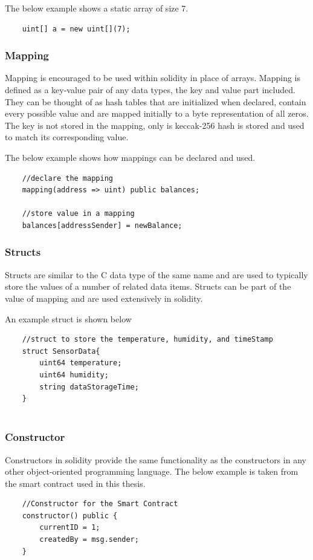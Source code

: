 \documentclass[11pt,openright]{report}
\begin{document}
The below example shows a static array of size 7.
\begin{verbatim}
    uint[] a = new uint[](7);
\end{verbatim}

\subsubsection{Mapping}
Mapping is encouraged to be used within solidity in place of arrays. Mapping is defined as a key-value pair of any data types, the key and value part included. They can be thought of as hash tables that are initialized when declared, contain every possible value and are mapped initially to a byte representation of all zeros. The key is not stored in the mapping, only is keccak-256 hash is stored and used to match its corresponding value.

The below example shows how mappings can be declared and used.
\begin{verbatim}
    //declare the mapping
    mapping(address => uint) public balances;
    
    //store value in a mapping
    balances[addressSender] = newBalance;
\end{verbatim}

\subsubsection{Structs}
Structs are similar to the C data type of the same name and are used to typically store the values of a number of related data items. Structs can be part of the value of mapping and are used extensively in solidity.

An example struct is shown below
\begin{verbatim}
    //struct to store the temperature, humidity, and timeStamp
    struct SensorData{
        uint64 temperature;
        uint64 humidity;
        string dataStorageTime;
    }
    
\end{verbatim}

\subsubsection{Constructor}
Constructors in solidity provide the same functionality as the constructors in any other object-oriented programming language. The below example is taken from the smart contract used in this thesis.
\begin{verbatim}
    //Constructor for the Smart Contract
    constructor() public {
        currentID = 1;
        createdBy = msg.sender;
    }
\end{verbatim}
\end{document}
